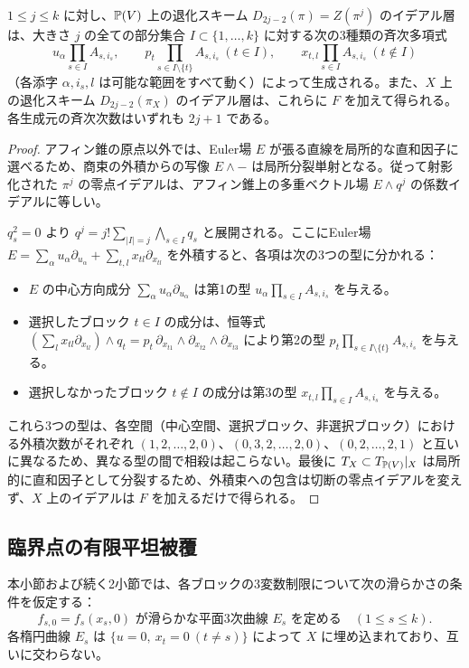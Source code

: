 \begin{proposition}\label{prop:pg-deg-ideal}
$1\leq j\leq k$ に対し、$\mathbb P(V)$ 上の退化スキーム $D_{2j-2}(\pi)=Z(\pi^j)$ のイデアル層は、大きさ $j$ の全ての部分集合 $I\subset\{1,\ldots,k\}$ に対する次の3種類の斉次多項式
\begin{equation}
u_\alpha\prod_{s\in I}A_{s,i_s},\qquad
p_t\prod_{s\in I\setminus\{t\}}A_{s,i_s}\ (t\in I),\qquad
x_{t,l}\prod_{s\in I}A_{s,i_s}\ (t\notin I)\label{eq:pg-deg-generators}
\end{equation}
（各添字 $\alpha,i_s,l$ は可能な範囲をすべて動く）によって生成される。また、$X$ 上の退化スキーム $D_{2j-2}(\pi_X)$ のイデアル層は、これらに $F$ を加えて得られる。各生成元の斉次次数はいずれも $2j+1$ である。
\end{proposition}
\begin{proof}
アフィン錐の原点以外では、Euler場 $E$ が張る直線を局所的な直和因子に選べるため、商束の外積からの写像 $E\wedge-$ は局所分裂単射となる。従って射影化された $\pi^j$ の零点イデアルは、アフィン錐上の多重ベクトル場 $E\wedge q^j$ の係数イデアルに等しい。

$q_s^2=0$ より $q^j=j!\sum_{|I|=j}\bigwedge_{s\in I}q_s$ と展開される。ここにEuler場 $E=\sum_\alpha u_\alpha\partial_{u_\alpha}+\sum_{t,l}x_{tl}\partial_{x_{tl}}$ を外積すると、各項は次の3つの型に分かれる：
\begin{itemize}
  \item $E$ の中心方向成分 $\sum_\alpha u_\alpha\partial_{u_\alpha}$ は第1の型 $u_\alpha\prod_{s\in I}A_{s,i_s}$ を与える。
  \item 選択したブロック $t\in I$ の成分は、恒等式 $(\sum_l x_{tl}\partial_{x_{tl}})\wedge q_t=p_t\,\partial_{x_{t1}}\wedge\partial_{x_{t2}}\wedge\partial_{x_{t3}}$ により第2の型 $p_t\prod_{s\in I\setminus\{t\}}A_{s,i_s}$ を与える。
  \item 選択しなかったブロック $t\notin I$ の成分は第3の型 $x_{t,l}\prod_{s\in I}A_{s,i_s}$ を与える。
\end{itemize}
これら3つの型は、各空間（中心空間、選択ブロック、非選択ブロック）における外積次数がそれぞれ $(1,2,\ldots,2,0)$、$(0,3,2,\ldots,2,0)$、$(0,2,\ldots,2,1)$ と互いに異なるため、異なる型の間で相殺は起こらない。最後に $T_X\subset T_{\mathbb P(V)}|_X$ は局所的に直和因子として分裂するため、外積束への包含は切断の零点イデアルを変えず、$X$ 上のイデアルは $F$ を加えるだけで得られる。
\end{proof}

\subsection{臨界点の有限平坦被覆}
本小節および続く2小節では、各ブロックの3変数制限について次の滑らかさの条件を仮定する：
\begin{equation}
f_{s,0}=f_s(x_s,0)\text{ が滑らかな平面3次曲線 }E_s\text{ を定める}\quad(1\le s\le k).\label{eq:pg-smooth-block}
\end{equation}
各楕円曲線 $E_s$ は $\{u=0,\ x_t=0\ (t\neq s)\}$ によって $X$ に埋め込まれており、互いに交わらない。

